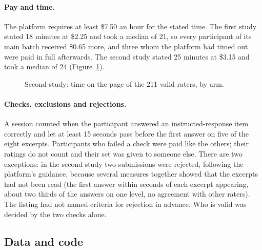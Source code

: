 \paragraph{Pay and time.} The platform requires at least \$7.50 an hour for the stated time. The first study
stated 18 minutes at \$2.25 and took a median of 21, so every participant of its main batch received \$0.65
more, and three whom the platform had timed out were paid in full afterwards. The second study stated 25
minutes at \$3.15 and took a median of 24 (Figure~\ref{fig:s2minutes}).

\begin{figure}[!htb]\centering

\caption{Second study: time on the page of the 211 valid raters, by arm.}\label{fig:s2minutes}
\end{figure}

\paragraph{Checks, exclusions and rejections.} A session counted when the participant answered an
instructed-response item correctly and let at least 15 seconds pass before the first answer on five of the
eight excerpts. Participants who failed a check were paid like the others; their ratings do not count and
their set was given to someone else. There are two exceptions: in the second study two submissions were
rejected, following the platform's guidance, because several measures together showed that the excerpts had not
been read (the first answer within seconds of each excerpt appearing, about two thirds of the answers on one
level, no agreement with other raters). The listing had not named criteria for rejection in advance. Who is
valid was decided by the two checks alone.

\subsection{Data and code}\label{sec:data}

